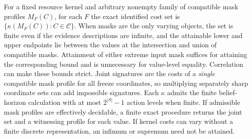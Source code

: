 \begin{theorem}\label{thm:t11}

For a fixed resource kernel and arbitrary nonempty family of compatible mask profiles \(M_F(C)\), for each \(F\) the exact identified cost set is \(\{\kappa(M_F(C)): C\in\mathcal C\}\). When masks are the only varying objects, the set is finite even if the evidence descriptions are infinite, and the attainable lower and upper endpoints lie between the values at the intersection and union of compatible masks. Attainment of either extreme input mask suffices for attaining the corresponding bound and is unnecessary for value-level equality. Correlation can make these bounds strict. Joint signatures are the costs of a \emph{single} compatible mask profile for all freeze coordinates, so multiplying separately sharp coordinate sets can add impossible signatures. Each \(\kappa\) admits the finite belief-horizon calculation with at most \(2^{|S|}-1\) action levels when finite. If admissible mask profiles are effectively decidable, a finite exact procedure returns the joint set and a witnessing profile for each value. If kernel costs can vary without a finite discrete representation, an infimum or supremum need not be attained.

\end{theorem}

